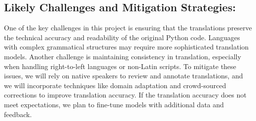 \documentclass[9pt]{papertex}
\begin{document}
\subsection{Likely Challenges and Mitigation Strategies: }
    One of the key challenges in this project is ensuring that the translations preserve the technical accuracy and readability of the original Python code. Languages with complex grammatical structures may require more sophisticated translation models. Another challenge is maintaining consistency in translation, especially when handling right-to-left languages or non-Latin scripts. To mitigate these issues, we will rely on native speakers to review and annotate translations, and we will incorporate techniques like domain adaptation and crowd-sourced corrections to improve translation accuracy. If the translation accuracy does not meet expectations, we plan to fine-tune models with additional data and feedback.
\end{document}
